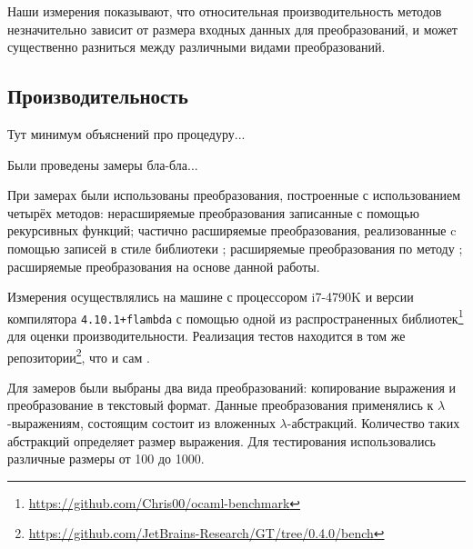 Наши измерения показывают, что относительная производительность методов незначительно зависит от размера входных данных для преобразований, и может существенно разниться между различными видами преобразований.

\subsection{Производительность}
\label{sec:performance}

%

Тут минимум объяснений про процедуру...

Были проведены замеры бла-бла...

При замерах были использованы преобразования, построенные с использованием четырёх методов:
нерасширяемые преобразования записанные с помощью рекурсивных функций;
частично расширяемые преобразования, реализованные c помощью записей в стиле библиотеки ;
расширяемые преобразования по методу \visitors{};
расширяемые преобразования на основе данной работы.

Измерения осуществлялись на машине с процессором i7-4790K и версии компилятора \texttt{4.10.1+flambda} с помощью одной из распространенных библиотек\footnote{\url{https://github.com/Chris00/ocaml-benchmark}} для оценки производительности. Реализация тестов находится в том же репозитории\footnote{\url{https://github.com/JetBrains-Research/GT/tree/0.4.0/bench}}, что и сам \GT{}.

Для замеров были выбраны два вида преобразований: копирование выражения и преобразование в текстовый формат.
Данные преобразования применялись к $\lambda$-выражениям, состоящим состоит из вложенных $\lambda$-абстракций.
Количество таких абстракций определяет размер выражения. Для тестирования использовались различные размеры от 100 до 1000.

